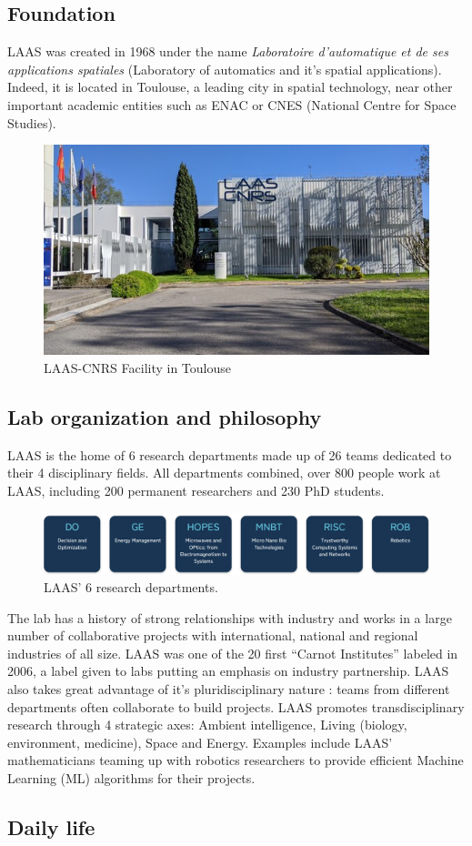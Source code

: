 \documentclass[a4paper,12pt]{article}
\theoremstyle{definition}
\theoremstyle{plain}
\begin{document}
\subsection{Foundation}
LAAS was created in 1968 under the name \textit{Laboratoire d'automatique et de ses applications spatiales} (Laboratory of automatics and it's spatial applications). Indeed, it is located in Toulouse, a leading city in spatial technology, near other important academic entities such as ENAC or CNES (National Centre for Space Studies).
\begin{figure}[H]
	\centering
	\includegraphics[width=0.4\linewidth]{figures/LAAS}
	\caption{LAAS-CNRS Facility in Toulouse}
	\label{fig:laas}
\end{figure}
\subsection{Lab organization and philosophy}
LAAS is the home of 6 research departments made up of 26 teams dedicated to their 4 disciplinary fields.
All departments combined, over 800 people work at LAAS, including 200 permanent researchers and 230 PhD students.
\begin{figure}[H]
	\centering
	\includegraphics[width=0.6\linewidth]{figures/LAAS_Departments}
	\caption{LAAS' 6 research departments.}
	\label{fig:laasdepartments}
\end{figure}
The lab has a history of strong relationships with industry and works in a large number of collaborative projects with international, national and regional industries of all size. LAAS was one of the 20 first “Carnot Institutes” labeled in 2006, a label given to labs putting an emphasis on industry partnership.
LAAS also takes great advantage of it's pluridisciplinary nature : teams from different departments often collaborate to build projects. LAAS promotes transdisciplinary research through 4 strategic axes: Ambient intelligence, Living (biology, environment, medicine), Space and Energy. Examples include LAAS' mathematicians teaming up with robotics researchers to provide efficient Machine Learning (ML) algorithms for their projects.
\subsection{Daily life}
\end{document}
